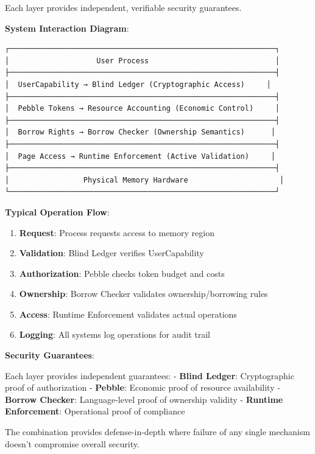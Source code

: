 \documentclass[11pt,letterpaper]{article}
\begin{document}
Each layer provides independent, verifiable security guarantees.

\textbf{System Interaction Diagram}:

\begin{lstlisting}
┌─────────────────────────────────────────────────────────────┐
│                    User Process                             │
├─────────────────────────────────────────────────────────────┤
│  UserCapability → Blind Ledger (Cryptographic Access)     │
├─────────────────────────────────────────────────────────────┤
│  Pebble Tokens → Resource Accounting (Economic Control)     │
├─────────────────────────────────────────────────────────────┤
│  Borrow Rights → Borrow Checker (Ownership Semantics)      │
├─────────────────────────────────────────────────────────────┤
│  Page Access → Runtime Enforcement (Active Validation)     │
├─────────────────────────────────────────────────────────────┤
│                 Physical Memory Hardware                     │
└─────────────────────────────────────────────────────────────┘
\end{lstlisting}

\textbf{Typical Operation Flow}:

\begin{enumerate}
\item \textbf{Request}: Process requests access to memory region
\item \textbf{Validation}: Blind Ledger verifies UserCapability
\item \textbf{Authorization}: Pebble checks token budget and costs
\item \textbf{Ownership}: Borrow Checker validates ownership/borrowing rules
\item \textbf{Access}: Runtime Enforcement validates actual operations
\item \textbf{Logging}: All systems log operations for audit trail
\end{enumerate}

\textbf{Security Guarantees}:

Each layer provides independent guarantees:
- \textbf{Blind Ledger}: Cryptographic proof of authorization
- \textbf{Pebble}: Economic proof of resource availability
- \textbf{Borrow Checker}: Language-level proof of ownership validity
- \textbf{Runtime Enforcement}: Operational proof of compliance

The combination provides defense-in-depth where failure of any single mechanism doesn't compromise overall security.
\end{document}
